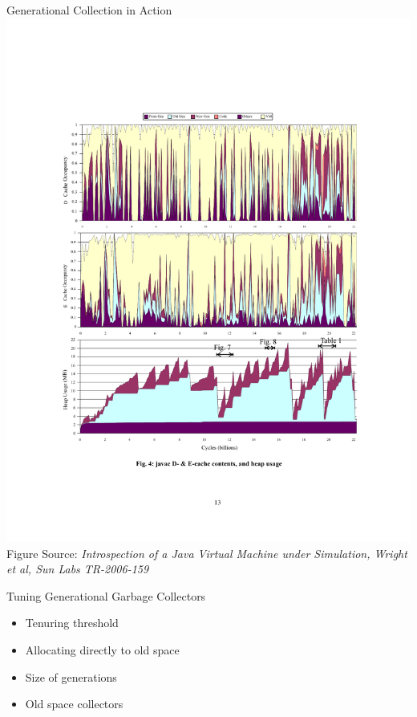 \documentclass[
14pt,
aspectratio=169,
usenames,
dvipsnames,
x11names]{beamer}
\newcommand{\src}[1]{\scriptsize Figure Source: \textit{#1}}
\begin{document}
\begin{frame}{Generational Collection in Action}
  \includegraphics[width=\columnwidth, clip, trim=3cm 4.75cm 2.5cm 17cm]{heap}
  \src{Introspection of a Java Virtual Machine under Simulation, Wright et al, Sun Labs TR-2006-159}
\end{frame}

\begin{frame}{Tuning Generational Garbage Collectors}
  \begin{itemize}  \setlength{\itemsep}{\fill}
  \item Tenuring threshold
  \item Allocating directly to old space
  \item Size of generations
  \item Old space collectors
  \end{itemize}
\end{frame}
\end{document}
